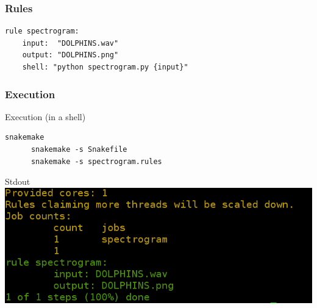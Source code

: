 \documentclass{beamer}
\begin{document}
\begin{frame}[fragile]
\frametitle{Rules}
\begin{center}

      \begin{minipage}{11cm}
        \begin{block}{}
            \begin{lstlisting}[basicstyle=\large]
rule spectrogram:
    input:  "DOLPHINS.wav"
    output: "DOLPHINS.png"
    shell: "python spectrogram.py {input}"
        \end{lstlisting}
         \end{block}        
          \end{minipage}
 \end{center}
\end{frame}


\begin{frame}[fragile]
\frametitle{Execution}

      \begin{block}{Execution (in a shell)}
	  \begin{lstlisting}[basicstyle=\large]
	  snakemake
	  snakemake -s Snakefile
	  snakemake -s spectrogram.rules
	  \end{lstlisting}
      \end{block}
    \begin{block}{Stdout}
    \centering
    \includegraphics[scale=0.3]{images/screen1.png}
    \end{block}     
\end{frame}



                
\end{document}
